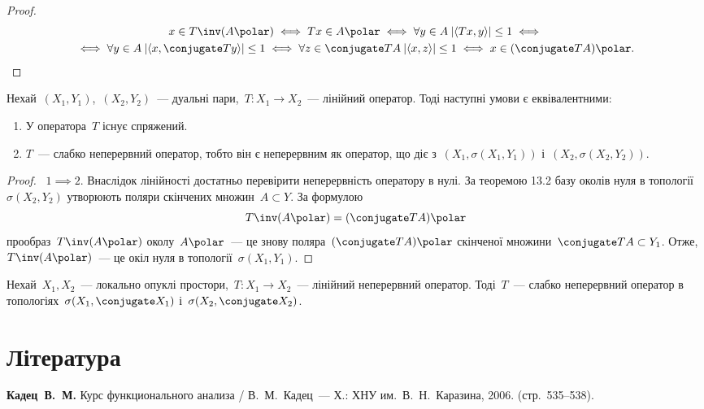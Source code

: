 \begin{proof}
    \begin{multline*}
        x \in T\inv(A\polar) \iff T x \in A\polar \iff \forall y \in A \: |\langle T x, y\rangle| \le 1 \iff \\
        \iff \forall y \in A \: |\langle x, \conjugate T y\rangle| \le 1 \iff \forall z \in \conjugate T A \: |\langle x, z\rangle| \le 1 \iff x \in (\conjugate T A)\polar. \qedhere
    \end{multline*}
\end{proof}

\begin{theorem}
    Нехай~$(X_1, Y_1)$,~$(X_2, Y_2)$~--- дуальні пари,~$T: X_1 \to X_2$~--- лінійний оператор. Тоді наступні умови є еквівалентними:
    \begin{enumerate}
        \item У оператора~$T$ існує спряжений.
        \item $T$~--- слабко неперервний оператор, тобто він є неперервним як оператор, що діє з~$(X_1, \sigma(X_1, Y_1))$ і~$(X_2, \sigma(X_2, Y_2))$.
    \end{enumerate}
\end{theorem}

\begin{proof}
   ~$1 \implies 2$. Внаслідок лінійності достатньо перевірити неперервність оператору в нулі. За теоремою 13.2 базу околів нуля в топології~$\sigma(X_2, Y_2)$ утворюють поляри скінчених множин~$A \subset Y$. За формулою
    \begin{equation*}
        T\inv(A\polar) = (\conjugate T A)\polar
    \end{equation*}
    прообраз~$T\inv(A\polar)$ околу~$A\polar$~--- це знову поляра~$(\conjugate T A)\polar$ скінченої множини~$\conjugate T A \subset Y_1$. Отже,~$T\inv(A\polar)$~--- це окіл нуля в топології~$\sigma(X_1, Y_1)$.
\end{proof}

\begin{corollary}
    Нехай~$X_1, X_2$~--- локально опуклі простори,~$T: X_1 \to X_2$~--- лінійний неперервний оператор. Тоді~$T$~--- слабко неперервний оператор в топологіях~$\sigma(X_1, \conjugate X_1)$ і~$\sigma(X_2, \conjugate X_2)$.
\end{corollary}

\section{Література}

\begin{enumerate}[label={[\arabic*]}]
\item \textbf{Кадец~В.~М.}
Курс функционального анализа /
В.~М.~Кадец~---
Х.: ХНУ им.~В.~Н.~Каразина, 2006. (стр.~535--538).
\end{enumerate}
